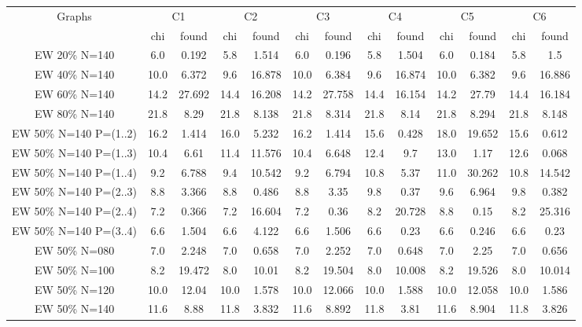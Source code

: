 \begin{sidewaystable}
\label{table:pdsatur:hardp}
\centering

\begin{tabular}{|c|cc|cc|cc|cc|cc|cc|}
\hline
\multicolumn{1}{|c|}{Graphs} & \multicolumn{2}{|c|}{C1} & \multicolumn{2}{|c|}{C2} & \multicolumn{2}{|c|}{C3} & \multicolumn{2}{|c|}{C4} & \multicolumn{2}{|c|}{C5} & \multicolumn{2}{|c|}{C6}
\\
 & chi & found & chi & found & chi & found & chi & found & chi & found & chi & found
\\
\hline
EW 20\% N=140 &  6.0 & 0.192 &  5.8 & 1.514 &  6.0 & 0.196 &  5.8 & 1.504 &  6.0 & 0.184 &  5.8 &  1.5
\\
EW 40\% N=140 & 10.0 & 6.372 &  9.6 & 16.878 & 10.0 & 6.384 &  9.6 & 16.874 & 10.0 & 6.382 &  9.6 & 16.886
\\
EW 60\% N=140 & 14.2 & 27.692 & 14.4 & 16.208 & 14.2 & 27.758 & 14.4 & 16.154 & 14.2 & 27.79 & 14.4 & 16.184
\\
EW 80\% N=140 & 21.8 & 8.29 & 21.8 & 8.138 & 21.8 & 8.314 & 21.8 & 8.14 & 21.8 & 8.294 & 21.8 & 8.148
\\
\hline
EW 50\% N=140 P=(1..2) & 16.2 & 1.414 & 16.0 & 5.232 & 16.2 & 1.414 & 15.6 & 0.428 & 18.0 & 19.652 & 15.6 & 0.612
\\
EW 50\% N=140 P=(1..3) & 10.4 & 6.61 & 11.4 & 11.576 & 10.4 & 6.648 & 12.4 &  9.7 & 13.0 & 1.17 & 12.6 & 0.068
\\
EW 50\% N=140 P=(1..4) &  9.2 & 6.788 &  9.4 & 10.542 &  9.2 & 6.794 & 10.8 & 5.37 & 11.0 & 30.262 & 10.8 & 14.542
\\
EW 50\% N=140 P=(2..3) &  8.8 & 3.366 &  8.8 & 0.486 &  8.8 & 3.35 &  9.8 & 0.37 &  9.6 & 6.964 &  9.8 & 0.382
\\
EW 50\% N=140 P=(2..4) &  7.2 & 0.366 &  7.2 & 16.604 &  7.2 & 0.36 &  8.2 & 20.728 &  8.8 & 0.15 &  8.2 & 25.316
\\
EW 50\% N=140 P=(3..4) &  6.6 & 1.504 &  6.6 & 4.122 &  6.6 & 1.506 &  6.6 & 0.23 &  6.6 & 0.246 &  6.6 & 0.23
\\
\hline
EW 50\% N=080 &  7.0 & 2.248 &  7.0 & 0.658 &  7.0 & 2.252 &  7.0 & 0.648 &  7.0 & 2.25 &  7.0 & 0.656
\\
EW 50\% N=100 &  8.2 & 19.472 &  8.0 & 10.01 &  8.2 & 19.504 &  8.0 & 10.008 &  8.2 & 19.526 &  8.0 & 10.014
\\
EW 50\% N=120 & 10.0 & 12.04 & 10.0 & 1.578 & 10.0 & 12.066 & 10.0 & 1.588 & 10.0 & 12.058 & 10.0 & 1.586
\\
EW 50\% N=140 & 11.6 & 8.88 & 11.8 & 3.832 & 11.6 & 8.892 & 11.8 & 3.81 & 11.6 & 8.904 & 11.8 & 3.826

\end{tabular}
\end{sidewaystable}
